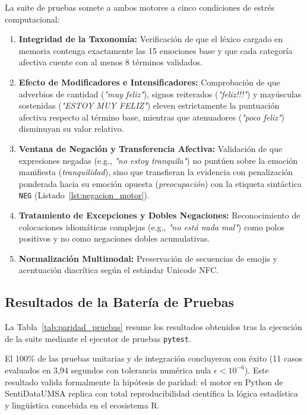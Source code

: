 La suite de pruebas somete a ambos motores a cinco condiciones de estrés computacional:
\begin{enumerate}
  \item \textbf{Integridad de la Taxonomía:} Verificación de que el léxico cargado en memoria contenga exactamente las 15 emociones base y que cada categoría afectiva cuente con al menos 8 términos validados.
  \item \textbf{Efecto de Modificadores e Intensificadores:} Comprobación de que adverbios de cantidad (\emph{"muy feliz"}), signos reiterados (\emph{"feliz!!!"}) y mayúsculas sostenidas (\emph{"ESTOY MUY FELIZ"}) eleven estrictamente la puntuación afectiva respecto al término base, mientras que atenuadores (\emph{"poco feliz"}) disminuyan su valor relativo.
  \item \textbf{Ventana de Negación y Transferencia Afectiva:} Validación de que expresiones negadas (e.g., \emph{"no estoy tranquila"}) no puntúen sobre la emoción manifiesta (\emph{tranquilidad}), sino que transfieran la evidencia con penalización ponderada hacia su emoción opuesta (\emph{preocupación}) con la etiqueta sintáctica \texttt{NEG} (Listado~\ref{lst:negacion_motor}).
  \item \textbf{Tratamiento de Excepciones y Dobles Negaciones:} Reconocimiento de colocaciones idiomáticas complejas (e.g., \emph{"no está nada mal"}) como polos positivos y no como negaciones dobles acumulativas.
  \item \textbf{Normalización Multimodal:} Preservación de secuencias de emojis y acentuación diacrítica según el estándar Unicode NFC.
\end{enumerate}



\subsection{Resultados de la Batería de Pruebas}

La Tabla~\ref{tab:paridad_pruebas} resume los resultados obtenidos tras la ejecución de la suite mediante el ejecutor de pruebas \texttt{pytest}.



El 100\% de las pruebas unitarias y de integración concluyeron con éxito (11 casos evaluados en 3,94 segundos con tolerancia numérica nula $\epsilon < 10^{-6}$). Este resultado valida formalmente la hipótesis de paridad: el motor en Python de SentiDataUMSA replica con total reproducibilidad científica la lógica estadística y lingüística concebida en el ecosistema R.
